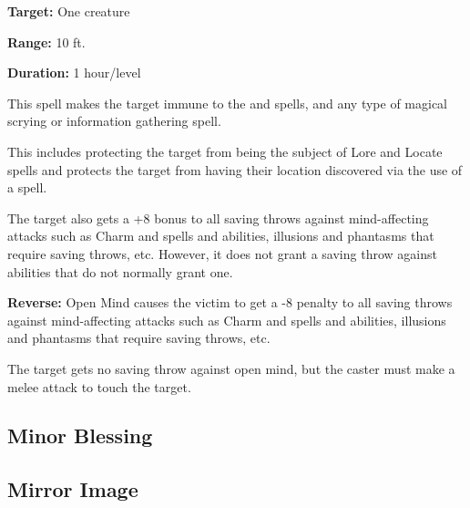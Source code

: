 \begin{multicols*}{2}
{\textbf{Target:} One creature

\textbf{Range:} 10 ft.

\textbf{Duration:} 1 hour/level}

This spell makes the target immune to the  and  spells, and any type of magical scrying or information gathering spell.

This includes protecting the target from being the subject of Lore and Locate spells and protects the target from having their location discovered via the use of a  spell.

The target also gets a +8 bonus to all saving throws against mind-affecting attacks such as Charm and  spells and abilities, illusions and phantasms that require saving throws, etc. However, it does not grant a saving throw against abilities that do not normally grant one.

\textbf{Reverse:} \hypertarget{spell:Open Mind}{Open Mind} causes the victim to get a -8 penalty to all saving throws against mind-affecting attacks such as Charm and  spells and abilities, illusions and phantasms that require saving throws, etc.

The target gets no saving throw against open mind, but the caster must make a melee attack to touch the target.

\subsection{Minor Blessing}\label{spell:Minor Blessing}



\subsection{Mirror Image}\label{spell:Mirror Image}


\end{multicols*}
